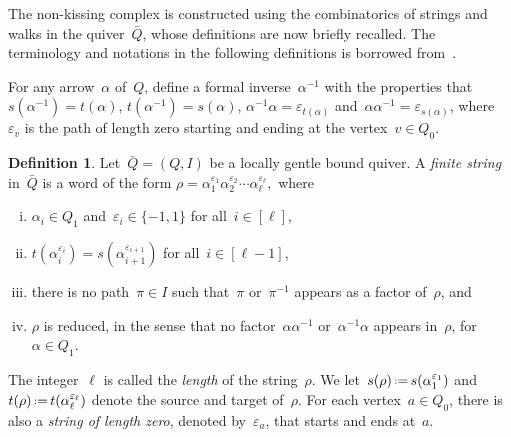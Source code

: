 \documentclass{amsart}
\theoremstyle{definition}
\newtheorem{definition}[theorem]{Definition}
\newcommand{\set}[2]{\left\{ #1 \;\middle|\; #2 \right\}} %
\newcommand{\eqdef}{\mbox{\,\raisebox{0.2ex}{\scriptsize\ensuremath{\mathrm:}}\ensuremath{=}\,}} %
\newcommand{\darkblue}{\color{darkblue}} %
\newcommand{\defn}[1]{\textsl{\darkblue #1}} %
\begin{document}
The non-kissing complex is constructed using the combinatorics of strings and walks in the quiver~$\bar Q$, whose definitions are now briefly recalled.
The terminology and notations in the following definitions is borrowed from~\cite{ButlerRingel, Crawley-Boevey}.

For any arrow~$\alpha$ of~$Q$, define a formal inverse~$\alpha^{-1}$ with the properties that~${s(\alpha^{-1}) = t(\alpha)}$, $t(\alpha^{-1}) = s(\alpha)$, $\alpha^{-1}\alpha = \varepsilon_{t(\alpha)}$ and~$\alpha\alpha^{-1} = \varepsilon_{s(\alpha)}$, where~$\varepsilon_v$ is the path of length zero starting and ending at the vertex~$v \in Q_0$. %

\begin{definition}
\label{def:string}
Let~$\bar Q = (Q,I)$ be a locally gentle bound quiver.
A \defn{finite string} in~$\bar Q$ is a word of the form
\(
\rho = \alpha_1^{\varepsilon_1}\alpha_2^{\varepsilon_2}\cdots \alpha_\ell^{\varepsilon_\ell},
\)
where
	\begin{enumerate}[(i)]
	\item $\alpha_i \in Q_1$ and~$\varepsilon_i \in \{-1,1\}$ for all~$i \in [\ell]$,
	\item $t(\alpha_i^{\varepsilon_i}) = s(\alpha_{i+1}^{\varepsilon_{i+1}})$ for all~$i \in [\ell-1]$,
	\item there is no path~$\pi \in I$ such that~$\pi$ or~$\pi^{-1}$ appears as a factor of~$\rho$, and
	\item $\rho$ is reduced, in the sense that no factor~$\alpha\alpha^{-1}$ or~$\alpha^{-1}\alpha$ appears in~$\rho$, for~$\alpha \in Q_1$.
	\end{enumerate}
The integer~$\ell$ is called the \defn{length} of the string~$\rho$.
We let~$s(\rho) \eqdef s(\alpha_1^{\varepsilon_1})$ and~$t(\rho) \eqdef t(\alpha_\ell^{\varepsilon_\ell})$ denote the source and target of~$\rho$.
For each vertex~$a \in Q_0$, there is also a \defn{string of length zero}, denoted by~$\varepsilon_a$, that starts and ends at~$a$.
\end{definition}
\end{document}
